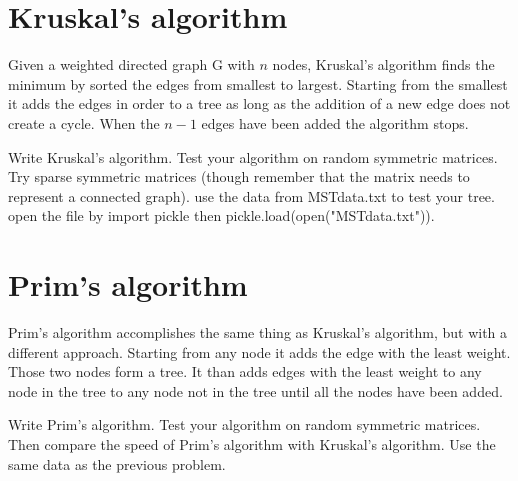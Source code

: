 \section*{Kruskal's algorithm}

Given a weighted directed graph G with $n$ nodes, Kruskal's algorithm finds the minimum by sorted the edges from smallest to largest. Starting from the smallest it adds the edges in order to a tree as long as the addition of a new edge does not create a cycle. When the $n-1$ edges have been added the algorithm stops. 

\begin{problem}
Write Kruskal's algorithm. Test your algorithm on random symmetric matrices. Try sparse symmetric matrices (though remember that the matrix needs to represent a connected graph). use the data from MSTdata.txt to test your tree. open the file by import pickle then pickle.load(open("MSTdata.txt")).
\end{problem}

\section*{Prim's algorithm}

Prim's algorithm accomplishes the same thing as Kruskal's algorithm, but with a different approach. Starting from any node it adds the edge with the least weight. Those two nodes form a tree. It than adds edges with the least weight to any node in the tree to any node not in the tree until all the nodes have been added. 

\begin{problem}
Write Prim's algorithm. Test your algorithm on random symmetric matrices. Then compare the speed of Prim's algorithm with Kruskal's algorithm. Use the same data as the previous problem. 
\end{problem}
